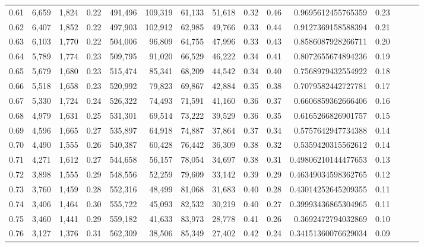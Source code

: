 \begin{tabular}{rrrrrrrrrrrrrrr}
0.61 &   6,659 &  1,824 &  0.22 &  491,496 &  109,319 &   61,133 &   51,618 &  0.32 &  0.46 &    0.9695612455765359 &      0.23 \\
0.62 &   6,407 &  1,852 &  0.22 &  497,903 &  102,912 &   62,985 &   49,766 &  0.33 &  0.44 &    0.9127369158588394 &      0.21 \\
0.63 &   6,103 &  1,770 &  0.22 &  504,006 &   96,809 &   64,755 &   47,996 &  0.33 &  0.43 &    0.8586087928266711 &      0.20 \\
0.64 &   5,789 &  1,774 &  0.23 &  509,795 &   91,020 &   66,529 &   46,222 &  0.34 &  0.41 &    0.8072655674894236 &      0.19 \\
0.65 &   5,679 &  1,680 &  0.23 &  515,474 &   85,341 &   68,209 &   44,542 &  0.34 &  0.40 &    0.7568979432554922 &      0.18 \\
0.66 &   5,518 &  1,658 &  0.23 &  520,992 &   79,823 &   69,867 &   42,884 &  0.35 &  0.38 &    0.7079582442727781 &      0.17 \\
0.67 &   5,330 &  1,724 &  0.24 &  526,322 &   74,493 &   71,591 &   41,160 &  0.36 &  0.37 &    0.6606859362666406 &      0.16 \\
0.68 &   4,979 &  1,631 &  0.25 &  531,301 &   69,514 &   73,222 &   39,529 &  0.36 &  0.35 &    0.6165266826901757 &      0.15 \\
0.69 &   4,596 &  1,665 &  0.27 &  535,897 &   64,918 &   74,887 &   37,864 &  0.37 &  0.34 &    0.5757642947734388 &      0.14 \\
0.70 &   4,490 &  1,555 &  0.26 &  540,387 &   60,428 &   76,442 &   36,309 &  0.38 &  0.32 &    0.5359420315562612 &      0.14 \\
0.71 &   4,271 &  1,612 &  0.27 &  544,658 &   56,157 &   78,054 &   34,697 &  0.38 &  0.31 &   0.49806210144477653 &      0.13 \\
0.72 &   3,898 &  1,555 &  0.29 &  548,556 &   52,259 &   79,609 &   33,142 &  0.39 &  0.29 &   0.46349034598362765 &      0.12 \\
0.73 &   3,760 &  1,459 &  0.28 &  552,316 &   48,499 &   81,068 &   31,683 &  0.40 &  0.28 &   0.43014252645209355 &      0.11 \\
0.74 &   3,406 &  1,464 &  0.30 &  555,722 &   45,093 &   82,532 &   30,219 &  0.40 &  0.27 &   0.39993436865304965 &      0.11 \\
0.75 &   3,460 &  1,441 &  0.29 &  559,182 &   41,633 &   83,973 &   28,778 &  0.41 &  0.26 &    0.3692472794032869 &      0.10 \\
0.76 &   3,127 &  1,376 &  0.31 &  562,309 &   38,506 &   85,349 &   27,402 &  0.42 &  0.24 &   0.34151360076629034 &      0.09 \\

\end{tabular}
